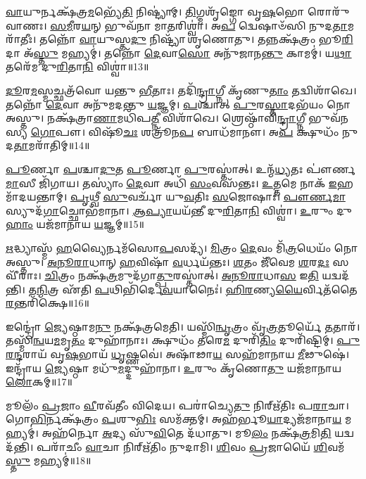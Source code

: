 \-\ul{𑌵𑌾}\-𑌯𑍁𑌰𑍍𑌨𑌕𑍍𑌷᳴𑌤𑍍𑌰\-\ul{𑌮}\-𑌭𑍍𑌯𑍇᳴\-\ul{𑌤𑌿} 𑌨𑌿𑌷𑍍𑌟𑍍𑌯𑌾॑𑌮𑍍।
\-\ul{𑌤𑌿}\-𑌗𑍍𑌮𑌶𑍃᳴𑌙𑍍𑌗𑍋 𑌵𑍃\-\ul{𑌷}\-𑌭𑍋 𑌰𑍋𑌰𑍁᳴𑌵𑌾𑌣𑌃।
\-\ul{𑌸}\-\-\ul{𑌮𑍀}\-𑌰\-\ul{𑌯}\-𑌨𑍍 𑌭𑍁𑌵᳴𑌨𑌾 𑌮𑌾\-\ul{𑌤}\-𑌰𑌿𑌶𑍍𑌵𑌾॑।
𑌅\-\ul{𑌪} 𑌦𑍍𑌵𑍇𑌷𑌾𑍞᳴𑌸𑌿 𑌨𑍁𑌦\-\ul{𑌤𑌾}\-𑌮𑌰𑌾᳴𑌤𑍀𑌃।
𑌤𑌨𑍍𑌨𑍋᳴ \ul{𑌵𑌾}\-𑌯𑍁𑌸𑍍𑌤\-\ul{𑌦𑍁} 𑌨𑌿𑌷𑍍𑌟𑍍𑌯𑌾᳴ 𑌶𑍃𑌣𑍋𑌤𑍁।
𑌤𑌨𑍍𑌨𑌕𑍍𑌷᳴𑌤𑍍𑌰𑌂 𑌭𑍂\-\ul{𑌰𑌿}\-𑌦𑌾 𑌅᳴\-\ul{𑌸𑍍𑌤𑍁} 𑌮𑌹𑍍𑌯𑌮𑍍॑।
𑌤𑌨𑍍𑌨𑍋᳴ \ul{𑌦𑍇}\-𑌵𑌾\-\ul{𑌸𑍋} 𑌅𑌨𑍁᳴𑌜𑌾𑌨\-\ul{𑌨𑍍𑌤𑍁} 𑌕𑌾𑌮𑌮𑍍॑।
𑌯\-\ul{𑌥𑌾} 𑌤𑌰𑍇᳴𑌮 𑌦𑍁\-\ul{𑌰𑌿}\-𑌤𑌾\-\ul{𑌨𑌿} 𑌵𑌿𑌶𑍍𑌵𑌾॑॥13॥ 

\-\ul{𑌦𑍂}\-𑌰\-\ul{𑌮}\-𑌸𑍍𑌮𑌚𑍍𑌛𑌤𑍍𑌰᳴𑌵𑍋 𑌯𑌨𑍍𑌤𑍁 \ul{𑌭𑍀}\-𑌤𑌾𑌃।
𑌤𑌦𑌿᳴\-\ul{𑌨𑍍𑌦𑍍𑌰𑌾}\-𑌗𑍍𑌨𑍀 𑌕𑍃᳴𑌣𑍁\-\ul{𑌤𑌾𑌂} 𑌤𑌦𑍍𑌵𑌿𑌶𑌾᳴𑌖𑍇।
𑌤𑌨𑍍𑌨𑍋᳴ \ul{𑌦𑍇}\-𑌵𑌾 𑌅𑌨𑍁᳴𑌮𑌦𑌨𑍍𑌤𑍁 \ul{𑌯}\-𑌜𑍍𑌞𑌮𑍍।
\-\ul{𑌪}\-𑌶𑍍𑌚𑌾𑌤𑍍 \ul{𑌪𑍁}\-𑌰\-\ul{𑌸𑍍𑌤𑌾}\-𑌦𑌭᳴𑌯𑌂 𑌨𑍋 𑌅𑌸𑍍𑌤𑍁।
𑌨𑌕𑍍𑌷᳴𑌤𑍍𑌰𑌾\-\ul{𑌣𑌾}\-𑌮𑌧𑌿᳴𑌪\-\ul{𑌤𑍍𑌨𑍀} 𑌵𑌿𑌶𑌾᳴𑌖𑍇।
𑌶𑍍𑌰𑍇𑌷𑍍𑌠𑌾᳴𑌵𑌿\-\ul{𑌨𑍍𑌦𑍍𑌰𑌾}\-𑌗𑍍𑌨𑍀 𑌭𑍁𑌵᳴𑌨𑌸𑍍𑌯 \ul{𑌗𑍋}\-𑌪𑍗।
𑌵𑌿𑌷𑍂᳴\-\ul{𑌚𑌃} 𑌶𑌤𑍍𑌰𑍂᳴𑌨\-\ul{𑌪} 𑌬𑌾𑌧᳴𑌮𑌾𑌨𑍗।
𑌅\-\ul{𑌪} 𑌕𑍍𑌷𑍁𑌧𑌂᳴ 𑌨𑍁𑌦\-\ul{𑌤𑌾}\-𑌮𑌰𑌾᳴𑌤𑌿𑌮𑍍॥14॥ 

\-\ul{𑌪𑍂}\-𑌰𑍍𑌣𑌾 \ul{𑌪}\-𑌶𑍍𑌚𑌾\-\ul{𑌦𑍁}\-𑌤 \ul{𑌪𑍂}\-𑌰𑍍𑌣𑌾 \ul{𑌪𑍁}\-𑌰𑌸𑍍𑌤𑌾॑𑌤𑍍।
𑌉𑌨𑍍𑌮᳴\-\ul{𑌧𑍍𑌯}\-𑌤𑌃 𑌪𑍗॑𑌰𑍍𑌣\-\ul{𑌮𑌾}\-𑌸𑍀 𑌜𑌿᳴𑌗𑌾𑌯।
𑌤𑌸𑍍𑌯𑌾𑌂॑ \ul{𑌦𑍇}\-𑌵𑌾 𑌅𑌧𑌿᳴ \ul{𑌸𑌂}\-𑌵𑌸᳴𑌨𑍍𑌤𑌃।
\-\ul{𑌉}\-\-\ul{𑌤𑍍𑌤}\-𑌮𑍇 𑌨𑌾𑌕᳴ \ul{𑌇}\-𑌹 𑌮𑌾᳴𑌦𑌯𑌨𑍍𑌤𑌾𑌮𑍍।
\-\ul{𑌪𑍃}\-𑌥𑍍𑌵𑍀 \ul{𑌸𑍁}\-𑌵𑌰𑍍𑌚𑌾᳴ 𑌯𑍁\-\ul{𑌵}\-𑌤𑌿𑌃 \ul{𑌸}\-𑌜𑍋𑌷𑌾𑌃॑।
\-\ul{𑌪𑍗}\-\-\ul{𑌰𑍍𑌣}\-\-\ul{𑌮𑌾}\-𑌸𑍍𑌯𑍁𑌦᳴\-\ul{𑌗𑌾}\-𑌚𑍍𑌛𑍋𑌭᳴𑌮𑌾𑌨𑌾।
\-\ul{𑌆}\-\-\ul{𑌪𑍍𑌯𑌾}\-𑌯𑌯᳴𑌨𑍍𑌤𑍀 𑌦𑍁\-\ul{𑌰𑌿}\-𑌤𑌾\-\ul{𑌨𑌿} 𑌵𑌿𑌶𑍍𑌵𑌾॑।
\-\ul{𑌉}\-𑌰𑍁𑌂 𑌦𑍁\-\ul{𑌹𑌾𑌂} 𑌯𑌜᳴𑌮𑌾𑌨𑌾𑌯 \ul{𑌯}\-𑌜𑍍𑌞𑌮𑍍॥15॥ 

\-\ul{𑌋}\-𑌦𑍍𑌧𑍍𑌯𑌾𑌸𑍍𑌮᳴ \ul{𑌹}\-𑌵𑍍𑌯𑍈𑌰𑍍𑌨𑌮᳴𑌸𑍋\-\ul{𑌪}\-𑌸𑌦𑍍𑌯᳴।
\-\ul{𑌮𑌿}\-𑌤𑍍𑌰𑌂 \ul{𑌦𑍇}\-𑌵𑌂 𑌮𑌿᳴\-\ul{𑌤𑍍𑌰}\-𑌧𑍇𑌯𑌂᳴ 𑌨𑍋 𑌅𑌸𑍍𑌤𑍁।
\-\ul{𑌅}\-\-\ul{𑌨𑍂}\-\-\ul{𑌰𑌾}\-𑌧𑌾𑌨𑍍 \ul{𑌹}\-𑌵𑌿𑌷𑌾᳴ \ul{𑌵}\-𑌰𑍍𑌧𑌯᳴𑌨𑍍𑌤𑌃।
\-\ul{𑌶}\-𑌤𑌂 𑌜𑍀᳴𑌵𑍇𑌮 \ul{𑌶}\-𑌰\-\ul{𑌦𑌃} 𑌸𑌵𑍀᳴𑌰𑌾𑌃।
\-\ul{𑌚𑌿}\-𑌤𑍍𑌰𑌂 𑌨𑌕𑍍𑌷᳴\-\ul{𑌤𑍍𑌰}\-𑌮𑍁𑌦᳴𑌗𑌾\-\ul{𑌤𑍍𑌪𑍁}\-𑌰𑌸𑍍𑌤𑌾॑𑌤𑍍।
\-\ul{𑌅}\-\-\ul{𑌨𑍂}\-\-\ul{𑌰𑌾}\-𑌧𑌾\-\ul{𑌸} 𑌇\-\ul{𑌤𑌿} 𑌯𑌦𑍍𑌵𑌦᳴𑌨𑍍𑌤𑌿।
𑌤\-\ul{𑌨𑍍𑌮𑌿}\-𑌤𑍍𑌰 𑌏᳴𑌤𑌿 \ul{𑌪}\-𑌥𑌿𑌭𑌿᳴𑌰𑍍𑌦𑍇\-\ul{𑌵}\-𑌯𑌾𑌨𑍈𑌃॑।
\-\ul{𑌹𑌿}\-\-\ul{𑌰}\-𑌣𑍍𑌯\-\ul{𑌯𑍈}\-𑌰𑍍𑌵𑌿𑌤᳴𑌤𑍈\-\-\ul{𑌰}\-𑌨𑍍𑌤𑌰𑌿᳴𑌕𑍍𑌷𑍇॥16॥ 

𑌇𑌨𑍍𑌦𑍍𑌰𑍋॑ \ul{𑌜𑍍𑌯𑍇}\-𑌷𑍍𑌠𑌾𑌮\-\ul{𑌨𑍁} 𑌨𑌕𑍍𑌷᳴𑌤𑍍𑌰𑌮𑍇𑌤𑌿।
𑌯𑌸𑍍𑌮𑌿᳴\-\ul{𑌨𑍍𑌵𑍃}\-𑌤𑍍𑌰𑌂 𑌵𑍃᳴\-\ul{𑌤𑍍𑌰}\-𑌤𑍂𑌰𑍍𑌯𑍇᳴ \ul{𑌤}\-𑌤𑌾𑌰᳴।
𑌤𑌸𑍍𑌮𑌿᳴\-\ul{𑌨𑍍𑌵}\-𑌯\-\ul{𑌮}\-𑌮𑍃\-\ul{𑌤𑌂} 𑌦𑍁𑌹𑌾᳴𑌨𑌾𑌃।
𑌕𑍍𑌷𑍁𑌧𑌂᳴ 𑌤𑌰𑍇\-\ul{𑌮} 𑌦𑍁𑌰𑌿᳴\-\ul{𑌤𑌿𑌂} 𑌦𑍁𑌰𑌿᳴𑌷𑍍𑌟𑌿𑌮𑍍।
\-\ul{𑌪𑍁}\-\-\ul{𑌰}\-\-\ul{𑌨𑍍𑌦}\-𑌰𑌾𑌯᳴ 𑌵𑍃\-\ul{𑌷}\-𑌭𑌾𑌯᳴ \ul{𑌧𑍃}\-𑌷𑍍𑌣𑌵𑍇॑।
𑌅𑌷𑌾᳴𑌢𑌾\-\ul{𑌯} 𑌸𑌹᳴𑌮𑌾𑌨𑌾𑌯 \ul{𑌮𑍀}\-𑌢𑍁𑌷𑍇॑।
𑌇𑌨𑍍𑌦𑍍𑌰𑌾᳴𑌯 \ul{𑌜𑍍𑌯𑍇}\-𑌷𑍍𑌠𑌾 𑌮𑌧𑍁᳴\-\ul{𑌮}\-𑌦𑍍𑌦𑍁𑌹𑌾᳴𑌨𑌾।
\-\ul{𑌉}\-𑌰𑍁𑌂 𑌕𑍃᳴𑌣𑍋\-\ul{𑌤𑍁} 𑌯𑌜᳴𑌮𑌾𑌨𑌾𑌯 \ul{𑌲𑍋}\-𑌕𑌮𑍍॥17॥ 

𑌮𑍂𑌲𑌂᳴ \ul{𑌪𑍍𑌰}\-𑌜𑌾𑌂 \ul{𑌵𑍀}\-𑌰𑌵᳴𑌤𑍀𑌂 𑌵𑌿𑌦𑍇𑌯।
𑌪𑌰𑌾॑𑌚𑍍𑌯𑍇\-\ul{𑌤𑍁} 𑌨𑌿𑌰𑍍‌𑌋᳴𑌤𑌿𑌃 𑌪\-\ul{𑌰𑌾}\-𑌚𑌾।
𑌗𑍋\-\ul{𑌭𑌿}\-𑌰𑍍𑌨𑌕𑍍𑌷᳴𑌤𑍍𑌰𑌂 \ul{𑌪}\-𑌶𑍁\-\ul{𑌭𑌿𑌃} 𑌸𑌮᳴𑌕𑍍𑌤𑌮𑍍।
𑌅𑌹᳴𑌰𑍍𑌭𑍂\-\ul{𑌯𑌾}\-𑌦𑍍𑌯𑌜᳴𑌮𑌾𑌨𑌾\-\ul{𑌯} 𑌮𑌹𑍍𑌯𑌮𑍍॑।
𑌅𑌹᳴𑌰𑍍𑌨𑍋 \ul{𑌅}\-𑌦𑍍𑌯 𑌸𑍁᳴\-\ul{𑌵𑌿}\-𑌤𑍇 𑌦᳴𑌧𑌾𑌤𑍁।
𑌮𑍂\-\ul{𑌲𑌂} 𑌨𑌕𑍍𑌷᳴\-\ul{𑌤𑍍𑌰}\-𑌮𑌿\-\ul{𑌤𑌿} 𑌯𑌦𑍍𑌵𑌦᳴𑌨𑍍𑌤𑌿।
𑌪𑌰𑌾᳴𑌚𑍀𑌂 \ul{𑌵𑌾}\-𑌚𑌾 𑌨𑌿𑌰𑍍‌𑌋᳴𑌤𑌿𑌂 𑌨𑍁𑌦𑌾𑌮𑌿।
\-\ul{𑌶𑌿}\-𑌵𑌂 \ul{𑌪𑍍𑌰}\-𑌜𑌾𑌯𑍈᳴ \ul{𑌶𑌿}\-𑌵𑌮᳴\-\ul{𑌸𑍍𑌤𑍁} 𑌮𑌹𑍍𑌯𑌮𑍍॑॥18॥ 

